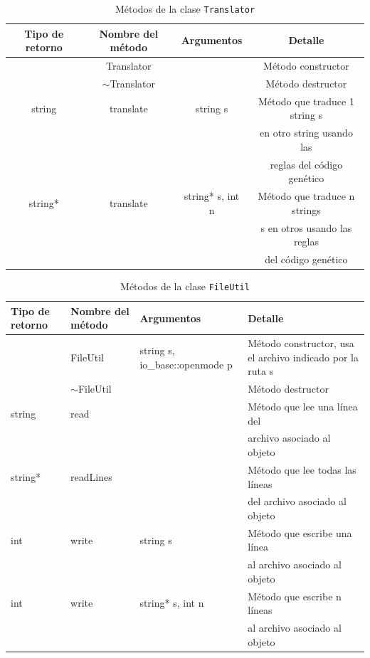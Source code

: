 \begin{table}[H]
\begin{center}
    \begin{tabular}{ |c|c|c|c| }
    	\hline
    	\cellcolor{cl} \textbf{Tipo de retorno} & \cellcolor{cl} \textbf{Nombre del método} & \cellcolor{cl} \textbf{Argumentos} & \cellcolor{cl} \textbf{Detalle}\\ \hline \hline
         & Translator &   & Método constructor\\  \hline
         & $\sim$Translator & & Método destructor\\ \hline
         string & translate & string s & Método que traduce 1 string s\\ & & & en otro string usando las\\ & & & reglas del código genético\\ \hline
         string* & translate & string* s, int n & Método que traduce n strings\\ & & & s en otros usando las reglas\\ & & &  del código genético\\ \hline
    \end{tabular}
\end{center}
\label{T1}
\caption{Métodos de la clase \texttt{Translator}}
\end{table}


\begin{table}[H]
\begin{center}
    \begin{tabular}{ |>{\centering\arraybackslash}m{3.5cm}|>{\centering\arraybackslash}m{3.9cm}|>{\centering\arraybackslash}m{3cm}|>{\centering\arraybackslash}m{5cm}| }
    	\hline
    	\cellcolor{cl} \textbf{Tipo de retorno} & \cellcolor{cl} \textbf{Nombre del método} & \cellcolor{cl} \textbf{Argumentos} & \cellcolor{cl} \textbf{Detalle}\\ \hline \hline
         & FileUtil & string s, io\_base::openmode p & Método constructor, usa el archivo indicado por la ruta s\\ \hline
         & $\sim$FileUtil  & & Método destructor\\ \hline
         string & read & & Método que lee una línea del
\\ & & & archivo asociado al objeto\\ \hline
         string* & readLines & & Método que lee todas las líneas\\ & & & del archivo asociado al objeto\\ \hline
         int & write & string s & Método que escribe una línea
\\ & & & al archivo asociado al objeto\\ \hline
         int & write & string* s, int n & Método que escribe n líneas\\ & & & al archivo asociado al objeto\\ \hline
    \end{tabular}
\end{center}
\label{T2}
\caption{Métodos de la clase \texttt{FileUtil}}
\end{table}

